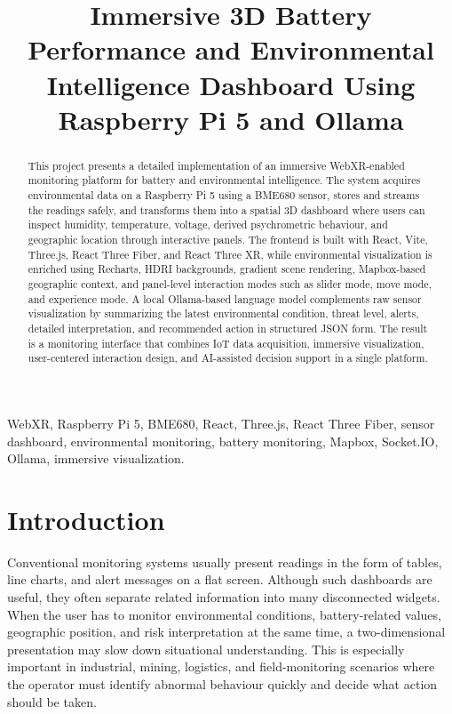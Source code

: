 \documentclass[conference]{IEEEtran}
\title{Immersive 3D Battery Performance and Environmental Intelligence Dashboard Using Raspberry Pi 5 and Ollama}
\author{
\IEEEauthorblockN{Vardhman Mehta}
\IEEEauthorblockA{Enrollment ID: 202201444 \\
\textit{School of Technology, Dhirubhai Ambani University} \\
Gandhinagar, India}
\and
\IEEEauthorblockN{Jaikrit Sanandiya}
\IEEEauthorblockA{Enrollment ID: 202201484 \\
\textit{School of Technology, Dhirubhai Ambani University} \\
Gandhinagar, India}
}
\begin{document}
\maketitle

\begin{abstract}
This project presents a detailed implementation of an immersive WebXR-enabled monitoring platform for battery and environmental intelligence. The system acquires environmental data on a Raspberry Pi 5 using a BME680 sensor, stores and streams the readings safely, and transforms them into a spatial 3D dashboard where users can inspect humidity, temperature, voltage, derived psychrometric behaviour, and geographic location through interactive panels. The frontend is built with React, Vite, Three.js, React Three Fiber, and React Three XR, while environmental visualization is enriched using Recharts, HDRI backgrounds, gradient scene rendering, Mapbox-based geographic context, and panel-level interaction modes such as slider mode, move mode, and experience mode. A local Ollama-based language model complements raw sensor visualization by summarizing the latest environmental condition, threat level, alerts, detailed interpretation, and recommended action in structured JSON form. The result is a monitoring interface that combines IoT data acquisition, immersive visualization, user-centered interaction design, and AI-assisted decision support in a single platform.
\end{abstract}

\begin{IEEEkeywords}
WebXR, Raspberry Pi 5, BME680, React, Three.js, React Three Fiber, sensor dashboard, environmental monitoring, battery monitoring, Mapbox, Socket.IO, Ollama, immersive visualization.
\end{IEEEkeywords}

\section{Introduction}
Conventional monitoring systems usually present readings in the form of tables, line charts, and alert messages on a flat screen. Although such dashboards are useful, they often separate related information into many disconnected widgets. When the user has to monitor environmental conditions, battery-related values, geographic position, and risk interpretation at the same time, a two-dimensional presentation may slow down situational understanding. This is especially important in industrial, mining, logistics, and field-monitoring scenarios where the operator must identify abnormal behaviour quickly and decide what action should be taken.
\end{document}

